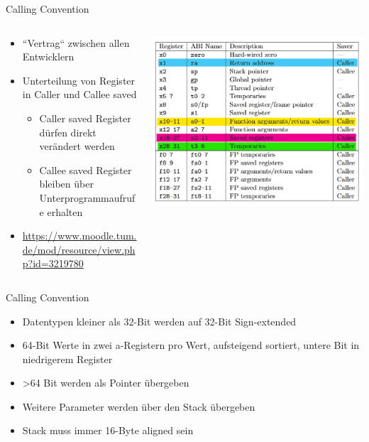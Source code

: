 \documentclass[
  german,            %
  aspectratio=169,    %
]{tumbeamer}
\begin{document}
\begin{frame}[c]{Calling Convention}
  \begin{columns}[c]
    \begin{column}{0.5\textwidth}
      \begin{itemize}
        \item ``Vertrag`` zwischen allen Entwicklern
        \item Unterteilung von Register in Caller und Callee saved
        \begin{itemize}
          \item Caller saved Register dürfen direkt verändert werden
          \item Callee saved Register bleiben über Unterprogrammaufrufe erhalten
        \end{itemize} 
        \item \url{https://www.moodle.tum.de/mod/resource/view.php?id=3219780}
      \end{itemize}
    \end{column}
    \begin{column}{0.5\textwidth}
      \includegraphics[width=\linewidth]{w03_calling_conv_regs.png}
    \end{column}
  \end{columns}
\end{frame}

\begin{frame}[c]{Calling Convention}                                    
  \begin{itemize}
    \item Datentypen kleiner als 32-Bit werden auf 32-Bit Sign-extended
    \item 64-Bit Werte in zwei a-Registern pro Wert, aufsteigend sortiert, untere Bit in niedrigerem Register
    \item >64 Bit werden als Pointer übergeben
    \item Weitere Parameter werden über den Stack übergeben
    \item Stack muss immer 16-Byte aligned sein
 \end{itemize}                                          
\end{frame}
\end{document}
